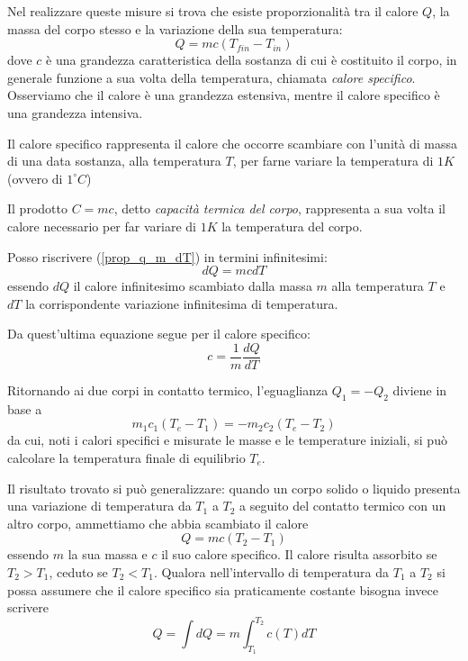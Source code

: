 \documentclass[class=book, crop=false, oneside, 12pt]{standalone}
\begin{document}
Nel realizzare queste misure si trova che esiste proporzionalità tra il calore \(Q\), la massa del corpo stesso e la variazione della sua temperatura:
\begin{equation} \label{prop_q_m_dT}
    Q = m c \left(T_{fin} - T_{in}\right)
\end{equation} 
dove \(c\) è una grandezza caratteristica della sostanza di cui è costituito il corpo, in generale funzione a sua volta della temperatura, chiamata \emph{calore specifico}.
Osserviamo che il calore è una grandezza estensiva, mentre il calore specifico è una grandezza intensiva.

Il calore specifico rappresenta il calore che occorre scambiare con l'unità di massa di una data sostanza, alla temperatura \(T\), per farne variare la temperatura di \(1 K\) (ovvero di \(1 ^{\circ} C\))

Il prodotto \(C = mc\), detto \emph{capacità termica del corpo}, rappresenta a sua volta il calore necessario per far variare di \(1 K\) la temperatura del corpo.

Posso riscrivere (\ref{prop_q_m_dT}) in termini infinitesimi:
\begin{equation}
    d Q = m c d T
\end{equation}
essendo \( d Q \) il calore infinitesimo scambiato dalla massa \(m\) alla temperatura \(T\) e \(d T\) la corrispondente variazione infinitesima di temperatura.

Da quest'ultima equazione segue per il calore specifico:
\begin{equation}
    c = \frac{1}{m} \frac{d Q}{d T}
\end{equation}

Ritornando ai due corpi in contatto termico, l'eguaglianza \(Q_1 = -Q_2\) diviene in base a 
\begin{equation*}
    m_1 c_1 (T_e - T_1) = - m_2 c_2 \left(T_e - T_2\right)
\end{equation*}
da cui, noti i calori specifici e misurate le masse e le temperature iniziali, si può calcolare la temperatura finale di equilibrio \(T_e\).

Il risultato trovato si può generalizzare: quando un corpo solido o liquido presenta una variazione di temperatura da \(T_1\) a \(T_2\) a seguito del contatto termico con un altro corpo, ammettiamo che abbia scambiato il calore
\begin{equation}
    Q = m c \left(T_2 - T_1\right)
\end{equation}
essendo \(m\) la sua massa e \(c\) il suo calore specifico. 
Il calore risulta assorbito se \(T_2 > T_1\), ceduto se \(T_2<T_1\). 
Qualora nell'intervallo di temperatura da \(T_1\) a \(T_2\) si possa assumere che il calore specifico sia praticamente costante bisogna invece scrivere
\begin{equation}
    Q = \int d Q = m \int_{T_1}^{T_2} c(T) d T
\end{equation} 
\end{document}

